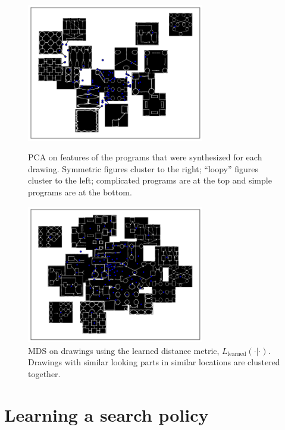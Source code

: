 \documentclass{article}
\begin{document}
\begin{figure}[h]
\centering  \begin{minipage}{\textwidth}\centering
  \includegraphics[width = 0.69\textwidth]{figures/PCA_improved.png}
    \caption{PCA on features of the programs that were synthesized for each drawing. Symmetric figures cluster to the right; ``loopy'' figures cluster to the left; complicated programs are at the top and simple programs are at the bottom.}    \label{NMF}
  \end{minipage} %
  \begin{minipage}{\textwidth}\centering
    \includegraphics[width = 0.69\textwidth]{figures/imageSimilarity.png} 
    \caption{MDS on drawings using the learned distance metric, $L_{\text{learned}}(\cdot|\cdot)$. Drawings with similar looking parts in similar locations are clustered together.}
  \end{minipage}
\end{figure}

\section{Learning a search policy}
\end{document}
